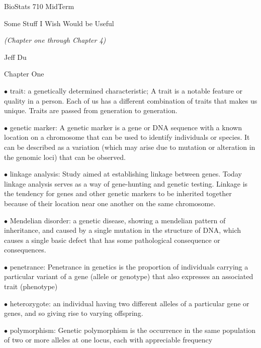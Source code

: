 \documentclass{article}
\begin{document}
\centerline{\sc \large BioStats 710 MidTerm}
\vspace{1pc}
\centerline{\sc Some Stuff I Wish Would be Useful}
\vspace{1pc}

\centerline{\it (Chapter one through Chapter 4)}

\vspace{1pc}
\centerline{\sc    Jeff Du}
\vspace{2pc}


\centerline{\sc Chapter One}
\vspace{0.2in}

$\bullet$ trait: 
a genetically determined characteristic; A trait is a notable feature or quality in a person. Each of us has a different combination of traits that makes us unique. 
Traits are passed from generation to generation.\vspace{0.1in}


$\bullet$ genetic marker: 
A genetic marker is a gene or DNA sequence with a known location on a chromosome that can be used to identify individuals or species. It can be described as a variation (which may arise due to mutation or alteration in the genomic loci) that can be observed. \vspace{0.1in}


$\bullet$ linkage analysis: 
Study aimed at establishing linkage between genes. Today linkage analysis serves as a way of gene-hunting and genetic testing. Linkage is the tendency for genes and other genetic markers to be inherited together because of their location near one another on the same chromosome.


\vspace{0.1in}
$\bullet$ Mendelian disorder: 
a genetic disease, showing a mendelian pattern of inheritance, and caused by a single mutation in the structure of DNA, which causes a single basic defect that has some pathological consequence or consequences.


\vspace{0.1in}
$\bullet$ penetrance: 
Penetrance in genetics is the proportion of individuals carrying a particular variant of a gene (allele or genotype) that also expresses an associated trait (phenotype)


\vspace{0.1in}
$\bullet$ heterozygote: 
an individual having two different alleles of a particular gene or genes, and so giving rise to varying offspring.


\vspace{0.1in}
$\bullet$ polymorphism: 
Genetic polymorphism is the occurrence in the same population of two or more alleles at one locus, each with appreciable frequency
\end{document}
